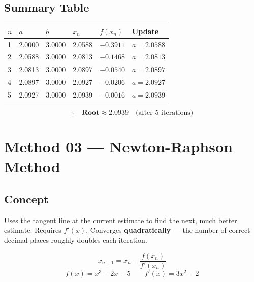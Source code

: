 \documentclass[12pt]{article}
\newcommand{\hcell}[1]{\textbf{\color{white}#1}}
\begin{document}
\subsection*{Summary Table}
\begin{center}
\begin{tabular}{C{0.8cm} C{1.8cm} C{1.8cm} C{1.8cm} C{2.2cm} C{3cm}}
\toprule
{}
\hcell{$n$} & \hcell{$a$} & \hcell{$b$} & \hcell{$x_n$} & \hcell{$f(x_n)$} & \hcell{Update} \\
\midrule
{}
1 & 2.0000 & 3.0000 & 2.0588 & $-0.3911$ & $a=2.0588$ \\
2 & 2.0588 & 3.0000 & 2.0813 & $-0.1468$ & $a=2.0813$ \\
3 & 2.0813 & 3.0000 & 2.0897 & $-0.0540$ & $a=2.0897$ \\
4 & 2.0897 & 3.0000 & 2.0927 & $-0.0206$ & $a=2.0927$ \\
5 & 2.0927 & 3.0000 & 2.0939 & $-0.0016$ & $a=2.0939$ \\
\bottomrule
\end{tabular}
\end{center}
\[
  \therefore\quad \textbf{Root} \approx \mathbf{2.0939} \quad\text{(after 5 iterations)}
\]

\newpage

\section{Method 03 --- Newton-Raphson Method}

\subsection*{Concept}
\begin{conceptbox}
Uses the tangent line at the current estimate to find the next, much better estimate. Requires $f'(x)$. Converges \textbf{quadratically} — the number of correct decimal places roughly doubles each iteration.
\end{conceptbox}

\vspace{8pt}

\begin{formulabox}
\[
  x_{n+1} = x_n - \frac{f(x_n)}{f'(x_n)}
\]
\vspace{-2pt}
\[
  f(x) = x^3 - 2x - 5 \qquad f'(x) = 3x^2 - 2
\]
\end{formulabox}
\end{document}
